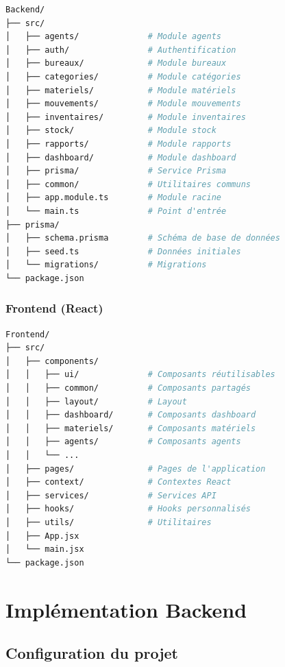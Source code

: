 \begin{lstlisting}[language=bash, caption=Structure du projet Backend]
Backend/
├── src/
│   ├── agents/              # Module agents
│   ├── auth/                # Authentification
│   ├── bureaux/             # Module bureaux
│   ├── categories/          # Module catégories
│   ├── materiels/           # Module matériels
│   ├── mouvements/          # Module mouvements
│   ├── inventaires/         # Module inventaires
│   ├── stock/               # Module stock
│   ├── rapports/            # Module rapports
│   ├── dashboard/           # Module dashboard
│   ├── prisma/              # Service Prisma
│   ├── common/              # Utilitaires communs
│   ├── app.module.ts        # Module racine
│   └── main.ts              # Point d'entrée
├── prisma/
│   ├── schema.prisma        # Schéma de base de données
│   ├── seed.ts              # Données initiales
│   └── migrations/          # Migrations
└── package.json
\end{lstlisting}

\subsubsection{Frontend (React)}

\begin{lstlisting}[language=bash, caption=Structure du projet Frontend]
Frontend/
├── src/
│   ├── components/
│   │   ├── ui/              # Composants réutilisables
│   │   ├── common/          # Composants partagés
│   │   ├── layout/          # Layout
│   │   ├── dashboard/       # Composants dashboard
│   │   ├── materiels/       # Composants matériels
│   │   ├── agents/          # Composants agents
│   │   └── ...
│   ├── pages/               # Pages de l'application
│   ├── context/             # Contextes React
│   ├── services/            # Services API
│   ├── hooks/               # Hooks personnalisés
│   ├── utils/               # Utilitaires
│   ├── App.jsx
│   └── main.jsx
└── package.json
\end{lstlisting}

\section{Implémentation Backend}

\subsection{Configuration du projet}

